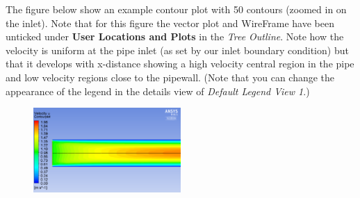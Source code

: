 \documentclass[11pt,a4paper,oneside,hidelinks]{scrartcl}
\newcommand\bfr[1]{\textcolor[rgb]{1,0.00,0.00}{\textbf{\textsf{#1}}}}
\begin{document}
The figure below show an example contour plot with 50 contours (zoomed in on the inlet). Note that for this figure the vector plot and WireFrame have been unticked under \bfr{User Locations and Plots} in the \emph{Tree Outline}. Note how the velocity is uniform at the pipe inlet (as set by our inlet boundary condition) but that it develops with x-distance showing a high velocity central region in the pipe and low velocity regions close to the pipewall. (Note that you can change the appearance of the legend in the details view of \emph{Default Legend View 1}.)
\begin{figure}[H]
\begin{center}
\includegraphics[width=0.5\textwidth,clip]{velocity_contour.png}
\end{center}
\end{figure}
\end{document}
